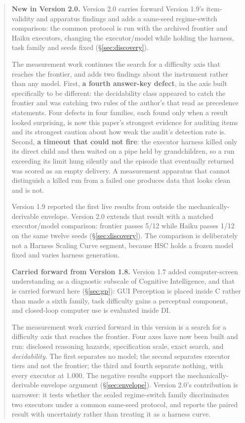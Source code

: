 \documentclass[11pt]{article}
\theoremstyle{definition}
\begin{document}
\begin{abstract}
\medskip
\noindent\textbf{New in Version 2.0.} Version 2.0 carries forward Version 1.9's item-validity and apparatus findings and adds a same-seed regime-switch comparison: the common protocol is run with the archived frontier and Haiku executors, changing the executor/model while holding the harness, task family and seeds fixed (\S\ref{sec:discovery}).

The measurement work continues the search for a difficulty axis that reaches the frontier, and adds two findings about the instrument rather than any model. First, \textbf{a fourth answer-key defect}, in the axis built specifically to be different: the decidability class appeared to catch the frontier and was catching two rules of the author's that read as precedence statements. Four defects in four families, each found only when a result looked surprising, is now this paper's strongest evidence for auditing items and its strongest caution about how weak the audit's detection rate is. Second, \textbf{a timeout that could not fire}: the executor harness killed only its direct child and then waited on a pipe held by grandchildren, so a run exceeding its limit hung silently and the episode that eventually returned was scored as an empty delivery. A measurement apparatus that cannot distinguish a killed run from a failed one produces data that looks clean and is not.

Version 1.9 reported the first live results from outside the mechanically-derivable envelope. Version 2.0 extends that result with a matched executor/model comparison: frontier passes 5/12 while Haiku passes 1/12 on the same twelve seeds (\S\ref{sec:discovery}). The comparison is deliberately not a Harness Scaling Curve segment, because HSC holds a frozen model fixed and varies harness generation.

\medskip
\noindent\textbf{Carried forward from Version 1.8.} Version 1.7 added computer-screen understanding as a diagnostic subscale of Cognitive Intelligence, and that is carried forward here (\S\ref{sec:gp}): GUI Perception is placed inside C rather than made a sixth family, task difficulty gains a perceptual component, and closed-loop computer use is evaluated inside DI.

The measurement work carried forward in this version is a search for a difficulty axis that reaches the frontier. Four axes have now been built and run: disclosed reasoning hazards, specification scale, exact search, and \emph{decidability}. The first separates no model; the second separates executor tiers and not the frontier; the third and fourth separate nothing, with every executor at 1.000. The negative results support the mechanically-derivable envelope argument (\S\ref{sec:envelope}). Version 2.0's contribution is narrower: it tests whether the sealed regime-switch family discriminates two executors under a common same-seed protocol, and reports the paired result with uncertainty rather than treating it as a harness curve.


\end{abstract}
\end{document}
